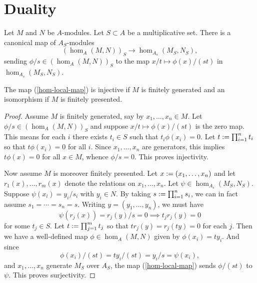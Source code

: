 
\section{Duality}

\begin{nothing}
  Let $M$ and $N$ be $A$-modules. Let $S \subset A$ be a
  multiplicative set. There is a canonical map of $A_S$-modules
  \begin{equation}
    \label{hom-local-map}
    (\hom_A(M,N))_S \to \hom_{A_s}(M_S,N_S),
  \end{equation}
  sending $\phi/s \in (\hom_A(M,N))_S$ to the map $x/t \mapsto
  \phi(x)/(st)$ in $\hom_{A_s}(M_S,N_S)$.
\end{nothing}

\begin{proposition}
  The map (\ref{hom-local-map}) is injective if $M$ is finitely
  generated and an isomorphism if $M$ is finitely presented.
\end{proposition}

\begin{proof}
  Assume $M$ is finitely generated, say by $x_1,\ldots,x_n \in M$. Let
  $\phi/s \in (\hom_A(M,N))_S$ and suppose $x/t \mapsto \phi(x)/(st)$
  is the zero map. This means for each $i$ there exists $t_i \in S$
  such that $t_i\phi(x_i) = 0$. Let $t \mathrel{:=} \prod_{i=1}^n t_i$ so that
  $t\phi(x_i) = 0$ for all $i$. Since $x_1,\ldots,x_n$ are generators,
  this implies $t\phi(x) = 0$ for all $x \in M$, whence $\phi/s =
  0$. This proves injectivity.

  Now assume $M$ is moreover finitely presented. Let $x \mathrel{:=}
  (x_1,\ldots,x_n)$ and let $r_1(x),\ldots,r_m(x)$ denote the
  relations on $x_1,\ldots,x_n$. Let $\psi \in
  \hom_{A_s}(M_S,N_S)$. Suppose $\psi(x_i) = y_i/s_i$ with $y_i \in
  N$. By taking $s \mathrel{:=} \prod_{i=1}^n s_i$, we can in fact assume $s_1
  = \cdots = s_n = s$. Writing $y = (y_1,\ldots,y_n)$, we must have
  \[
  \psi(r_j(x)) = r_j(y)/s = 0 \implies t_jr_j(y) = 0
  \]
  for some $t_j \in S$. Let $t \mathrel{:=} \prod_{j=1}^m t_j$ so that $tr_j(y)
  = r_j(ty) = 0$ for each $j$. Then we have a well-defined map $\phi
  \in \hom_A(M,N)$ given by $\phi(x_i) = ty_i$. And since
  \[
  \phi(x_i)/(st) = ty_i/(st) = y_i/s = \psi(x_i),
  \]
  and $x_1,\ldots,x_n$ generate $M_S$ over $A_S$, the map
  (\ref{hom-local-map}) sends $\phi/(st)$ to $\psi$. This proves
  surjectivity.
\end{proof}






